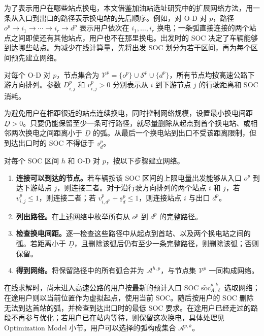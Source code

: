\documentclass[12pt,a4paper,UTF8]{ctexart}
\begin{document}
为了表示用户在哪些站点换电，本文借鉴加油站选址研究中的扩展网络方法，用一条从入口到出口的路径表示换电站的先后顺序。例如，对 O-D 对 $p$，路径
$o^p\rightarrow i_1\rightarrow\cdots\rightarrow i_r\rightarrow d^p$ 表示用户依次在 $i_1,\ldots,i_r$ 换电；一条弧直接连接的两个站点之间即使还有其他站点，用户也不在那里换电。出发时的 SOC 决定了车辆能够到达哪些站点。为减少在线计算量，先将出发 SOC 划分为若干区间，再为每个区间预先建立网络。

对每个 O-D 对 $p$，节点集合为
$\mathcal V^p=\{o^p\}\cup\mathcal S^p\cup\{d^p\}$，所有节点均按高速公路下游方向排列。参数 $D_{i,j}^p$ 和 $v_{i,j}^p>0$ 分别表示从 $i$ 到下游节点 $j$ 的行驶距离和 SOC 消耗。

为避免用户在相距很近的站点连续换电，同时控制网络规模，设置最小换电间距 $\underline D>0$。只要仍能保留至少一条可行路径，就尽量删除从起点到首个换电站、或相邻两次换电之间距离小于 $\underline D$ 的弧。从最后一个换电站到出口不受该距离限制，但到达出口时的 SOC 不得低于 $\underline s_d^p$。

对每个 SOC 区间 $h$ 和 O-D 对 $p$，按以下步骤建立网络。

\begin{enumerate}
  \item[\textbf{Step 1.}] \textbf{连接可以到达的节点。}若车辆按该 SOC 区间的上限电量出发能够从入口 $o^p$ 到达下游站点 $j$，则连接二者。对于沿行驶方向排列的两个站点 $i$ 和 $j$，若 $v_{i,j}^p\le1$，则连接二者；若 $v_{i,d^p}^p+\underline s_d^p\le1$，则连接站点 $i$ 与出口 $d^p$。

  \item[\textbf{Step 2.}] \textbf{列出路径。}在上述网络中枚举所有从 $o^p$ 到 $d^p$ 的完整路径。

  \item[\textbf{Step 3.}] \textbf{检查换电间距。}逐一检查这些路径中从起点到首站、以及两个换电站之间的弧。若距离小于 $\underline D$，且删除该弧后仍有至少一条完整路径，则删除该弧；否则保留。

  \item[\textbf{Step 4.}] \textbf{得到网络。}将保留路径中的所有弧合并为 $\mathcal A^{h,p}$，与节点集 $\mathcal V^p$ 一同构成网络。
\end{enumerate}

在线求解时，尚未进入高速公路的用户按最新的预计入口 SOC $\widetilde{\mathrm{soc}}_{A,\ell}^{p,k}$ 选取网络；在途用户则以当前位置作为虚拟起点，使用当前 SOC。随后按用户的 SOC 删除无法到达首站的弧，并检查到达出口时的最低 SOC 要求。在途用户已经走过的路段不再参与优化；若用户已在站内等待，则保留这次换电，具体处理见 Optimization Model 小节。用户可以选择的弧构成集合 $\mathcal A^{p,k}$。
\end{document}
